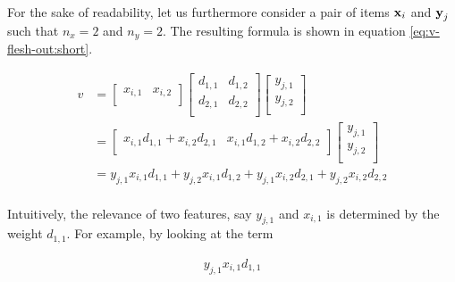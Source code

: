 For the sake of readability, let us furthermore consider a pair of items $\boldsymbol{\mathbf{x}}_i$ and $\boldsymbol{\mathbf{y}}_j$ such that $n_x = 2$ and $n_y = 2$. The resulting formula is shown in equation \ref{eq:v-flesh-out:short}.

\begin{equation} \label{eq:v-flesh-out:short}
    \begin{split} 
        v &= 
            \begin{bmatrix}
                x_{i,1} & x_{i,2} \\
            \end{bmatrix}
            \begin{bmatrix}
                d_{1,1} & d_{1,2} \\
                d_{2,1} & d_{2,2} \\
            \end{bmatrix}
            \begin{bmatrix}
                y_{j,1} \\
                y_{j,2} \\
            \end{bmatrix} \\
        &=
            \begin{bmatrix}
                x_{i,1}d_{1,1} + x_{i,2}d_{2,1} & x_{i,1}d_{1,2} + x_{i,2}d_{2,2} \\
            \end{bmatrix}    
            \begin{bmatrix}
                y_{j,1} \\
                y_{j,2} \\
            \end{bmatrix} \\
        &= 
            y_{j,1}x_{i,1}d_{1,1} + y_{j,2}x_{i,1}d_{1,2} + y_{j,1}x_{i,2}d_{2,1} + y_{j,2}x_{i,2}d_{2,2} \\
    \end{split}
\end{equation}

Intuitively, the relevance of two features, say $y_{j,1}$ and $x_{i,1}$ is determined by the weight $d_{1,1}$. For example, by looking at the term

\begin{equation} \nonumber
    \begin{split}
        y_{j,1}x_{i,1}d_{1,1}
    \end{split}
\end{equation}

